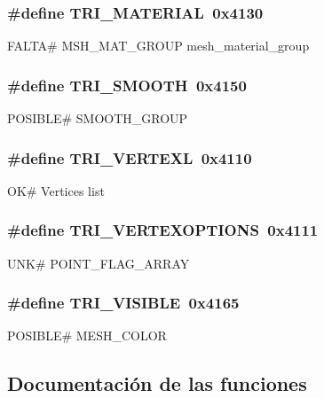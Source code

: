 \subsubsection[{TRI\_\-MATERIAL}]{\setlength{\rightskip}{0pt plus 5cm}\#define TRI\_\-MATERIAL~0x4130}\label{objetos_8h_adf958945f9ca6a11dd6dc9900b038523}
FALTA\# MSH\_\-MAT\_\-GROUP mesh\_\-material\_\-group 
\subsubsection[{TRI\_\-SMOOTH}]{\setlength{\rightskip}{0pt plus 5cm}\#define TRI\_\-SMOOTH~0x4150}\label{objetos_8h_ae37eb990650413fcfd3281ff25f89e32}
POSIBLE\# SMOOTH\_\-GROUP 
\subsubsection[{TRI\_\-VERTEXL}]{\setlength{\rightskip}{0pt plus 5cm}\#define TRI\_\-VERTEXL~0x4110}\label{objetos_8h_aa2ed62aba74d2ee70c828600be3105f1}
OK\# Vertices list 
\subsubsection[{TRI\_\-VERTEXOPTIONS}]{\setlength{\rightskip}{0pt plus 5cm}\#define TRI\_\-VERTEXOPTIONS~0x4111}\label{objetos_8h_a5b77b286ad52d41568fccdac45942765}
UNK\# POINT\_\-FLAG\_\-ARRAY 
\subsubsection[{TRI\_\-VISIBLE}]{\setlength{\rightskip}{0pt plus 5cm}\#define TRI\_\-VISIBLE~0x4165}\label{objetos_8h_afbee9cf3b965e943dd07b07fd032adff}
POSIBLE\# MESH\_\-COLOR 

\subsection{Documentación de las funciones}
